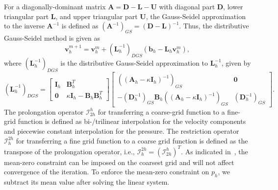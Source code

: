 \documentclass[preprint,11pt]{elsarticle}
\theoremstyle{remark}
\begin{document}
For a diagonally-dominant matrix $\mathbf{A} = \mathbf{D}-\mathbf{L}-\mathbf{U}$ with diagonal part $\mathbf{D}$, lower triangular part $\mathbf{L}$, and upper triangular part $\mathbf{U}$, the Gauss-Seidel approximation to the inverse $\mathbf{A}^{-1}$ is defined as $(\mathbf{A}^{-1})_{GS}=(\mathbf{D}-\mathbf{L})^{-1}$.
Thus, the distributive Gauss-Seidel method is given as
\begin{equation}
    \mathbf{v}_h^{m+1} = 
    \mathbf{v}_h^{m} + (\mathbf{L}_h^{-1})_{DGS} \left (
    \mathbf{b}_h -
    \mathbf{L}_h
    \mathbf{v}_h^m
    \right ),
\end{equation}
where $(\mathbf{L}_h^{-1})_{DGS}$ is the distributive Gauss-Seidel approximation to $\mathbf{L}_h^{-1}$, given by
\begin{equation}
    (\mathbf{L}_h^{-1})_{DGS} = 
    \begin{bmatrix}
        \mathbf{I}_h & \mathbf{B}_h^T \\
        \mathbf{0} & \kappa\mathbf{I}_h-\mathbf{B}_h\mathbf{B}_h^T
    \end{bmatrix}
    \begin{bmatrix}
        ((\mathbf{A}_h - \kappa\mathbf{I}_h)^{-1})_{GS} & \mathbf{0}\\
        -(\mathbf{D}_h^{-1})_{GS}\mathbf{B}_h((\mathbf{A}_h - \kappa\mathbf{I}_h)^{-1})_{GS} & (\mathbf{D}_h^{-1})_{GS}
    \end{bmatrix}.
\end{equation}
The prolongation operator $\mathcal{I}_{2h}^h$ for transferring a coarse-grid function to a fine-grid function is defined as bi-/trilinear interpolation for the velocity components and piecewise constant interpolation for the pressure.
The restriction operator $\mathcal{I}_{h}^{2h}$ for transferring a fine grid function to a coarse grid function is defined as the transpose of the prolongation operator, i.e., $\mathcal{I}_{h}^{2h} = (\mathcal{I}_{2h}^h)^T$.
As indicated in~\cite{trottenberg2001multigrid}, the mean-zero constraint can be imposed on the coarsest grid and will not affect convergence of the iteration.
To enforce the mean-zero constraint on $p_h$, we subtract its mean value after solving the linear system.
\end{document}
